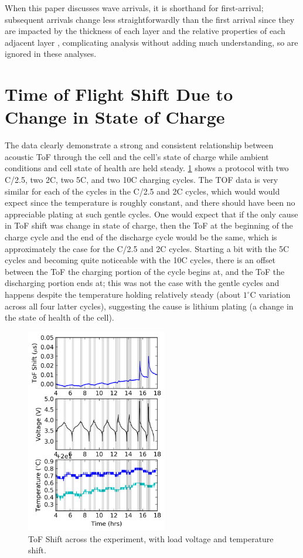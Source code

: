 When this paper discusses wave arrivals, it is shorthand for first-arrival; subsequent arrivals change less straightforwardly than the first arrival since they are impacted by the thickness of each layer and the relative properties of each adjacent layer \cite{SOC-SOH-EST}, complicating analysis without adding much understanding, so are ignored in these analyses.

\section{Time of Flight Shift Due to Change in State of Charge}
The data clearly demonstrate a strong and consistent relationship between acoustic ToF through the cell and the cell's state of charge while ambient conditions and cell state of health are held steady.  \hyperref[fig:0315]{\cref{fig:0315}} shows a protocol with two C/2.5, two 2C, two 5C, and two 10C charging cycles. The TOF data is very similar for each of the cycles in the C/2.5 and 2C cycles, which would would expect since the temperature is roughly constant, and there should have been no appreciable plating at such gentle cycles. One would expect that if the only cause in ToF shift was change in state of charge, then the ToF at the beginning of the charge cycle and the end of the discharge cycle would be the same, which is approximately the case for the C/2.5 and 2C cycles. Starting a bit with the 5C cycles and becoming quite noticeable with the 10C cycles, there is an offset between the ToF the charging portion of the cycle begins at, and the ToF the discharging portion ends at; this was not the case with the gentle cycles and happens despite the temperature holding relatively steady (about $1^{\circ}$C variation across all four latter cycles), suggesting the cause is lithium plating (a change in the state of health of the cell).

\begin{figure}[t]\label{fig:0315}
    \includegraphics[width=0.55\textwidth]{Thesis/0315.png}
    \centering
    \caption{ToF Shift across the experiment, with load voltage and temperature shift.}
\end{figure}

